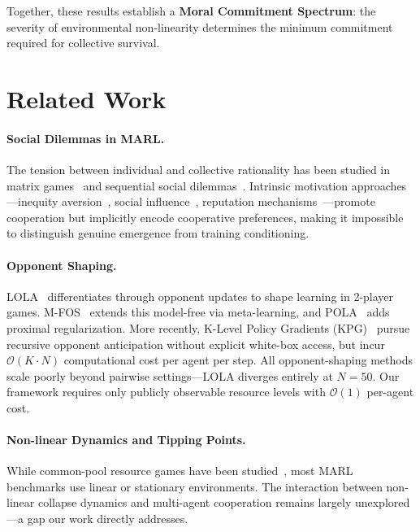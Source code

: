 \documentclass{article}
\begin{document}
Together, these results establish a \textbf{Moral Commitment Spectrum}: the severity of environmental non-linearity determines the minimum commitment required for collective survival.

\section{Related Work}

\paragraph{Social Dilemmas in MARL.}
The tension between individual and collective rationality has been studied in matrix games~\citep{leibo2017multi} and sequential social dilemmas~\citep{hughes2018inequity}.
Intrinsic motivation approaches---inequity aversion~\citep{hughes2018inequity}, social influence~\citep{jaques2019social}, reputation mechanisms~\citep{anastassacos2020cooperation}---promote cooperation but implicitly encode cooperative preferences, making it impossible to distinguish genuine emergence from training conditioning.

\paragraph{Opponent Shaping.}
LOLA~\citep{foerster2018learning} differentiates through opponent updates to shape learning in 2-player games.
M-FOS~\citep{lu2022model} extends this model-free via meta-learning, and POLA~\citep{zhao2022proximal} adds proximal regularization.
More recently, K-Level Policy Gradients (KPG)~\citep{somani2024kpg} pursue recursive opponent anticipation without explicit white-box access, but incur $\mathcal{O}(K \cdot N)$ computational cost per agent per step.
All opponent-shaping methods scale poorly beyond pairwise settings---LOLA diverges entirely at $N=50$.
Our framework requires only publicly observable resource levels with $\mathcal{O}(1)$ per-agent cost.

\paragraph{Non-linear Dynamics and Tipping Points.}
While common-pool resource games have been studied~\citep{ostrom1990governing}, most MARL benchmarks use linear or stationary environments.
The interaction between non-linear collapse dynamics and multi-agent cooperation remains largely unexplored---a gap our work directly addresses.
\end{document}
